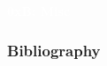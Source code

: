 \documentclass[aspectratio=169]{beamer}
\begin{document}
{
\begin{frame}
\huge{\textcolor{white}{\textbf{0xB: Misc}}}
\end{frame}
}

\begin{frame}
    \frametitle{Bibliography}

\end{frame}



\end{document}
